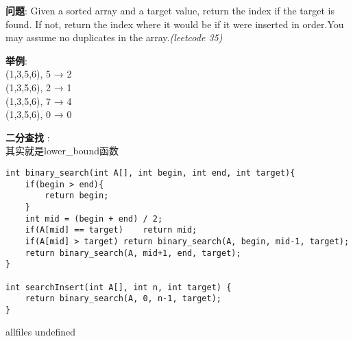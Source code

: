 \documentclass{article}
\begin{document}
\begin{CJK}{UTF8}{gbsn}     %

\else
    
\begin{description}
    \item{\textbf{问题}}: Given a sorted array and a target value, return the index if the target is found. If not, return the index where it would be if it were inserted in order.You may assume no duplicates in the array.\textit{(leetcode 35)}
	\item{\textbf{举例}}:\\
(1,3,5,6), 5 → 2\\
(1,3,5,6), 2 → 1\\
(1,3,5,6), 7 → 4\\
(1,3,5,6), 0 → 0\\
    \item{\textbf{二分查找}} : 
    \\其实就是lower\_bound函数
    \begin{lstlisting}
int binary_search(int A[], int begin, int end, int target){
	if(begin > end){
		return begin;
	}
	int mid = (begin + end) / 2;
	if(A[mid] == target)	return mid;
	if(A[mid] > target)	return binary_search(A, begin, mid-1, target);
	return binary_search(A, mid+1, end, target);
}

int searchInsert(int A[], int n, int target) {
	return binary_search(A, 0, n-1, target);
}
    \end{lstlisting}
\end{description}

\fi

\ifx allfiles undefined
\end{CJK}
\end{document}
